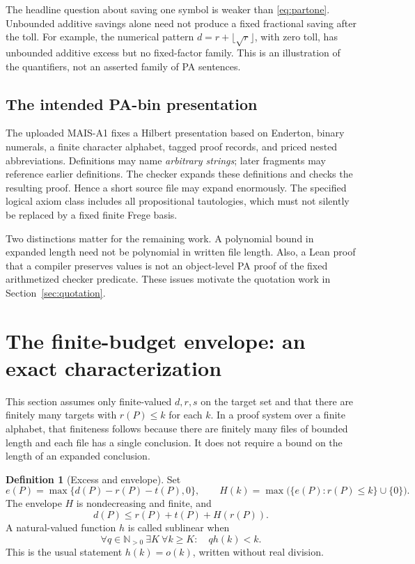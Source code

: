 \documentclass[11pt]{article}
\theoremstyle{definition}
\newtheorem{definition}[theorem]{Definition}
\theoremstyle{remark}
\newcommand{\N}{\mathbb N}
\begin{document}
The headline question about saving one symbol is weaker than
\eqref{eq:partone}. Unbounded additive savings alone need not produce a fixed
fractional saving after the toll. For example, the numerical pattern
$d=r+\lfloor\sqrt r\rfloor$, with zero toll, has unbounded additive excess
but no fixed-factor family. This is an illustration of the quantifiers, not
an asserted family of PA sentences.

\subsection{The intended PA-bin presentation}
The uploaded MAIS-A1 fixes a Hilbert presentation based on Enderton, binary
numerals, a finite character alphabet, tagged proof records, and priced nested
abbreviations. Definitions may name \emph{arbitrary strings}; later fragments
may reference earlier definitions. The checker expands these definitions and
checks the resulting proof. Hence a short source file may expand enormously.
The specified logical axiom class includes all propositional tautologies,
which must not silently be replaced by a fixed finite Frege basis.

Two distinctions matter for the remaining work. A polynomial bound in expanded
length need not be polynomial in written file length. Also, a Lean proof that
a compiler preserves values is not an object-level PA proof of the fixed
arithmetized checker predicate. These issues motivate the quotation work in
Section~\ref{sec:quotation}.

\section{The finite-budget envelope: an exact characterization}
\label{sec:envelope}

This section assumes only finite-valued $d,r,s$ on the target set and that
there are finitely many targets with $r(P)\le k$ for each $k$. In a proof system
over a finite alphabet, that finiteness follows because there are finitely
many files of bounded length and each file has a single conclusion. It does
not require a bound on the length of an expanded conclusion.

\begin{definition}[Excess and envelope]
Set
\begin{equation}\label{eq:envelope}
 e(P)=\max\{d(P)-r(P)-t(P),0\},\qquad
 H(k)=\max\bigl(\{e(P):r(P)\le k\}\cup\{0\}\bigr).
\end{equation}
The envelope $H$ is nondecreasing and finite, and
\begin{equation}\label{eq:universal-envelope}
 d(P)\le r(P)+t(P)+H(r(P)).
\end{equation}
A natural-valued function $h$ is called sublinear when
\begin{equation}\label{eq:sublinear}
 \forall q\in\N_{>0}\ \exists K\ \forall k\ge K:\quad qh(k)<k.
\end{equation}
This is the usual statement $h(k)=o(k)$, written without real division.
\end{definition}
\end{document}
